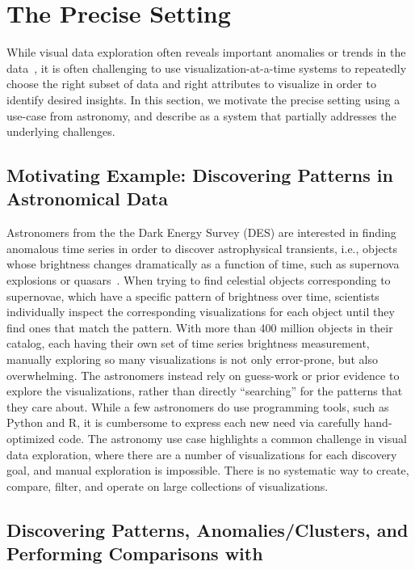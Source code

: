 
\section{The Precise Setting}\label{sec:precise}
While visual data exploration often reveals 
important anomalies or trends 
in the data~\cite{Heer2012,Morton2014}, 
it is often challenging to 
use visualization-at-a-time systems to 
repeatedly choose the right subset of 
data and right attributes to visualize
in order to identify desired insights.
In this section, we motivate
the precise setting using a use-case from
astronomy, and describe \zv as a system
that partially addresses the underlying challenges.

\subsection{Motivating Example: Discovering Patterns in Astronomical Data}
Astronomers from the the Dark Energy Survey (DES) 
are interested in finding 
anomalous time series 
in order to discover 
astrophysical transients, 
i.e., objects whose brightness 
changes dramatically as a function of time, 
such as supernova explosions or quasars~\cite{Drlica-Wagner2017}. 
When trying to find celestial objects 
corresponding to supernovae, 
which have a specific pattern of brightness over time, 
scientists individually inspect the corresponding 
visualizations for each object until 
they find ones that match the pattern. 
With more than 400 million objects in their catalog, 
each having their own set of time series brightness measurement, 
manually exploring so many 
visualizations is not only error-prone, 
but also overwhelming.
The astronomers instead rely on guess-work 
or prior evidence to explore the visualizations,
rather than directly ``searching'' for the patterns
that they care about. 
While a few astronomers do use 
programming tools, such as Python and R,
it is cumbersome to express each new need
via carefully hand-optimized code. 
The astronomy use case highlights a 
common challenge in visual data exploration,
where there are a number of visualizations
for each discovery goal,
and manual exploration is impossible.
There is no systematic way to create, compare, filter,
and operate on large collections of visualizations.

\subsection{Discovering Patterns, Anomalies/Clusters, and Performing Comparisons with \zv}


